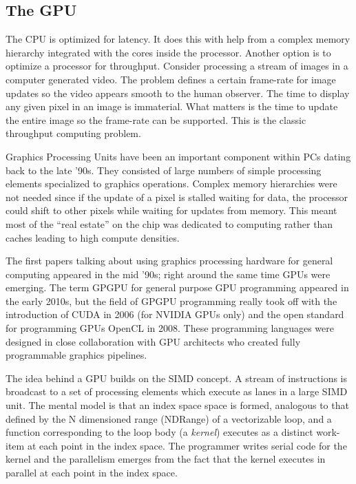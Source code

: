    
\subsection{The GPU}

The CPU is optimized for latency.   It does this with help from a complex memory hierarchy integrated with the cores
inside the processor.  Another option is to optimize a processor for throughput.  Consider processing a stream of images
in a computer generated video.   The problem defines a certain frame-rate for image updates so the video appears smooth to the human
observer.  The time to display any given pixel in an image is immaterial.  What matters is the time to update the entire
image so the frame-rate can be supported.  This is the classic throughput computing problem.  

Graphics Processing Units have been an important component within PCs dating back to the late '90s.  They consisted of large numbers of
simple processing elements specialized to graphics operations.  Complex memory hierarchies were not needed since if the
update of a pixel is stalled waiting for data, the processor could shift to other pixels while waiting for updates from memory.
This meant most of the ``real estate'' on the chip was dedicated to computing rather than caches leading to high compute densities.

The first papers talking about using graphics processing hardware for general computing appeared in the mid '90s; right around the
same time GPUs were emerging.  The term GPGPU for general purpose GPU programming appeared in the early 2010s, but the
field of GPGPU programming really took off with the introduction of CUDA in 2006 (for NVIDIA GPUs only) and the open standard for 
programming GPUs OpenCL in 2008.  These programming languages were designed in close collaboration with GPU architects who
created fully programmable graphics pipelines.

The idea behind a GPU builds on the SIMD concept.  A stream of instructions is broadcast to a set of processing 
elements which execute as lanes in a large SIMD unit.  The mental model is that an index space space is formed, analogous 
to that defined by the N dimensioned range (NDRange) of a vectorizable loop, and a function corresponding 
to the loop body (a \emph{kernel}) executes as a distinct
work-item at each point in the index space.  The programmer writes serial code for the kernel and the parallelism emerges
from the fact that the kernel executes in parallel at each point in the index space.

